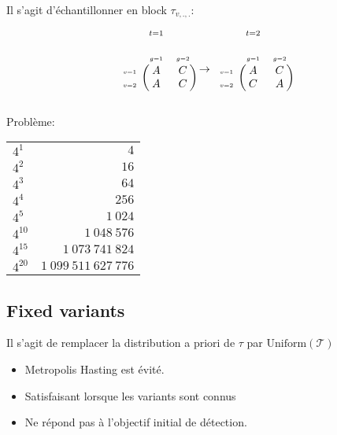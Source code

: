 \documentclass{beamer}
\begin{document}
\begin{frame}
Il s'agit d'échantillonner en block $\tau_{v,.,.}$:


$$\overset{t=1}{\begin{blockarray}{ccc}
    &&\\&\scriptscriptstyle g=1&\scriptscriptstyle g=2\\
    \begin{block}{c(cc)}
 {\scriptscriptstyle v=1}&A&C\\   
  {\scriptscriptstyle v=2}&A&C\\   
    \end{block}
\end{blockarray}}  \to \overset{t=2}{\begin{blockarray}{ccc}
    &&\\&\scriptscriptstyle g=1&\scriptscriptstyle g=2\\
    \begin{block}{c(cc)}
 {\scriptscriptstyle v=1}&A&C\\   
  {\scriptscriptstyle v=2}&C&A\\   
    \end{block}
\end{blockarray}}$$

Problème:

\begin{table}[H]
\centering
\begin{tabular}{lr}
  \hline
$4^{1}$&$4$\\$4^{2}$&$16$\\$4^{3}$&$64$\\$4^{4}$&$256$\\$4^{5}$&$1~024$\\$4^{10}$&$1~048~576$\\$4^{15}$&$1~073~741~824$\\$4^{20}$&$1~099~511~627~776$\\   \hline
\end{tabular}
\end{table}

\end{frame}

\subsection{Fixed variants}

\begin{frame}
Il s'agit de remplacer la distribution a priori de $\tau$ par 
$\mathrm{Uniform}(\mathcal{T})$
\begin{itemize}
\item Metropolis Hasting est évité.
\item Satisfaisant lorsque les variants sont connus
\item Ne répond pas à l'objectif initial de détection.
\end{itemize}
\end{frame}
\end{document}
